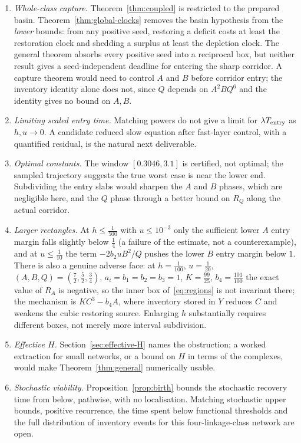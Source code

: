 \documentclass[11pt,a4paper]{article}
\theoremstyle{plain}
\theoremstyle{definition}
\theoremstyle{remark}
\begin{document}
\begin{enumerate}[label=(O\arabic*)]
\item \emph{Whole-class capture.} Theorem~\ref{thm:coupled} is restricted to the prepared basin. Theorem~\ref{thm:global-clocks} removes the basin hypothesis from the \emph{lower} bounds: from any positive seed, restoring a deficit costs at least the restoration clock and shedding a surplus at least the depletion clock. The general theorem absorbs every positive seed into a reciprocal box, but neither result gives a seed-independent deadline for entering the sharp corridor. A capture theorem would need to control $A$ and $B$ before corridor entry; the inventory identity alone does not, since $\dot Q$ depends on $A^2BQ^6$ and the identity gives no bound on $A,B$.
\item \emph{Limiting scaled entry time.} Matching powers do not give a limit for $\lambda T_{\rm entry}$ as $h,u\to0$. A candidate reduced slow equation after fast-layer control, with a quantified residual, is the natural next deliverable.
\item \emph{Optimal constants.} The window $[0.3046,3.1]$ is certified, not optimal; the sampled trajectory suggests the true worst case is near the lower end. Subdividing the entry slabs would sharpen the $A$ and $B$ phases, which are negligible here, and the $Q$ phase through a better bound on $R_Q$ along the actual corridor.
\item \emph{Larger rectangles.} At $h\le\tfrac1{500}$ with $u\le10^{-3}$ only the sufficient lower $A$ entry margin falls slightly below $\tfrac14$ (a failure of the estimate, not a counterexample), and at $u\le\tfrac1{10}$ the term $-2b_2uB^2/Q$ pushes the lower $B$ entry margin below $1$. There is also a genuine adverse face: at $h=\tfrac1{100}$, $u=\tfrac1{20}$, $(A,B,Q)=(\tfrac72,\tfrac52,\tfrac34)$, $a_i=b_1=b_2=b_3=1$, $K=\tfrac{99}{25}$, $b_4=\tfrac{101}{100}$ the exact value of $R_A$ is negative, so the inner box of~\eqref{eq:regions} is not invariant there; the mechanism is $KC^3-b_4A$, where inventory stored in $Y$ reduces $C$ and weakens the cubic restoring source. Enlarging $h$ substantially requires different boxes, not merely more interval subdivision.
\item \emph{Effective $H$.} Section~\ref{sec:effective-H} names the obstruction; a worked extraction for small networks, or a bound on $H$ in terms of the complexes, would make Theorem~\ref{thm:general} numerically usable.
\item \emph{Stochastic viability.} Proposition~\ref{prop:birth} bounds the stochastic recovery time from below, pathwise, with no localisation. Matching stochastic upper bounds, positive recurrence, the time spent below functional thresholds and the full distribution of inventory events for this four-linkage-class network are open.
\end{enumerate}
\end{document}

